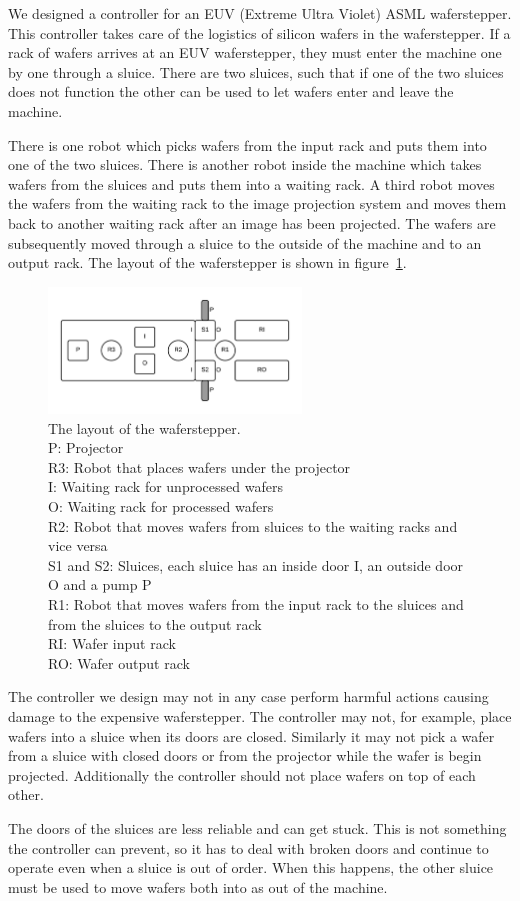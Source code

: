 We designed a controller for an EUV (Extreme Ultra Violet) ASML waferstepper. This controller takes care of the logistics of silicon wafers in the waferstepper. If a rack of wafers arrives at an EUV waferstepper, they must enter the machine one by one through a sluice. There are two sluices, such that if one of the two sluices does not function the other can be used to let wafers enter and leave the machine.

There is one robot which picks wafers from the input rack and puts them into one of the two sluices. There is another robot inside the machine which takes wafers from the sluices and puts them into a waiting rack. A third robot moves the wafers from the waiting rack to the image projection system and moves them back to another waiting rack after an image has been projected. The wafers are subsequently moved through a sluice to the outside of the machine and to an output rack. The layout of the waferstepper is shown in figure~\ref{fig:stepperlayout}.

\begin{figure}[h]
    \centering
	\includegraphics[width=0.6\textwidth]{waferstepper.png}
	\caption{The layout of the waferstepper.\\
	P: Projector\\R3: Robot that places wafers under the projector\\
	I: Waiting rack for unprocessed wafers\\
	O: Waiting rack for processed wafers\\
	R2: Robot that moves wafers from sluices to the waiting racks and vice versa\\
	S1 and S2: Sluices, each sluice has an inside door I, an outside door O and a pump P\\
	R1: Robot that moves wafers from the input rack to the sluices and from the sluices to the output rack\\
	RI: Wafer input rack\\
	RO: Wafer output rack}
	\label{fig:stepperlayout}
\end{figure}

The controller we design may not in any case perform harmful actions causing damage to the expensive waferstepper. The controller may not, for example, place wafers into a sluice when its doors are closed. Similarly it may not pick a wafer from a sluice with closed doors or from the projector while the wafer is begin projected. Additionally the controller should not place wafers on top of each other.

The doors of the sluices are less reliable and can get stuck. This is not something the controller can prevent, so it has to deal with broken doors and continue to operate even when a sluice is out of order. When this happens, the other sluice must be used to move wafers both into as out of the machine.
